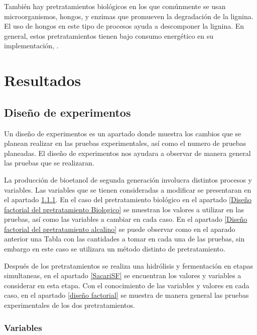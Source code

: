 \documentclass[12pt]{article}
\begin{document}
	También hay pretratamientos biológicos en los que comúnmente se usan microorganismos, hongos, y enzimas que promueven la degradación de la lignina. El uso de hongos en este tipo de procesos ayuda a descomponer la lignina. En general, estos pretratamientos tienen bajo consumo energético en su implementación, \cite{Gonzalez2018desarrollo}. 
	
	\section{Resultados}
	
	\subsection{Diseño de experimentos}
	Un diseño de experimentos es un apartado donde muestra los cambios que se planean realizar en las pruebas experimentales, así como el numero de pruebas planeadas. El diseño de experimentos nos ayudara a observar de manera general las pruebas que se realizaran.
	
	La producción de bioetanol de segunda generación involucra distintos procesos y variables. Las variables que se tienen consideradas a modificar se presentaran en el apartado \ref{variables}. En el caso del pretratamiento biológico en el apartado \ref{Diseño factorial del pretratamiento Biologico} se muestran los valores a utilizar en las  pruebas, así como las variables a cambiar en cada caso. En el apartado \ref{Diseño factorial del pretratamiento alcalino} se puede observar como en el aparado anterior una Tabla con las cantidades a tomar en cada una de las pruebas, sin embargo en este caso se utilizara un método distinto de pretratamiento.
	
   Después de los pretratamientos se realiza una hidrólisis y fermentación en etapas simultaneas, en el apartado \ref{SacariSF} se encuentran los valores y variables a considerar en esta etapa. Con el conocimiento de las variables y valores en cada caso, en el apartado \ref{diseño factorial} se muestra de manera general las pruebas experimentales de los dos pretratamientos.
	
	
 		\subsubsection{Variables}
		\label{variables}
		
\end{document}
